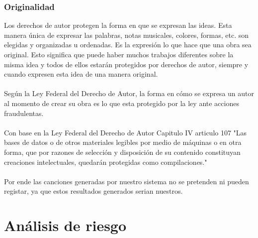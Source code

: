 \documentclass[12pt, a4paper, titlepage]{report}
\begin{document}
    	\subsubsection*{Originalidad}
    	Los derechos de autor protegen la forma en que se expresan las ideas. Esta manera única de expresar las palabras, notas musicales, colores, formas, etc. son elegidas y organizadas u ordenadas. Es la expresión lo que hace que una obra sea original. Esto significa que puede haber muchos trabajos diferentes sobre la misma idea y todos de ellos estarán protegidos por derechos de autor, siempre y cuando expresen esta idea de una manera original.\cite{refOriginalidadWipo}\\\\
    	Según la Ley Federal del Derecho de Autor, la forma en cómo se expresa un autor al momento de crear su obra es lo que esta protegido por la ley ante acciones fraudulentas.\cite{refOriginalidadLFDA}\\\\
    	Con base en la Ley Federal del Derecho de Autor Capitulo IV articulo 107 "Las bases de datos o de otros materiales legibles por medio de máquinas o en otra forma, que por razones de selección y disposición de su contenido constituyan creaciones intelectuales, quedarán protegidas como compilaciones."\cite{refOriginalidadLFDA}\\\\
    	Por ende las canciones generadas por nuestro sistema no se pretenden ni pueden registar, ya que estos resultados generados serian nuestros.
    	
    	\section{Análisis de riesgo}
    	
\end{document}
